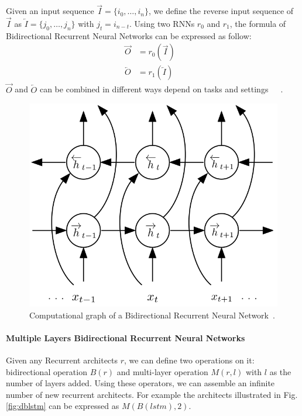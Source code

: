 Given an input sequence \(\overrightarrow{I} = \{i_0,\ldots,i_n\}\), we define the reverse input sequence of \(\overrightarrow{I}\) as \(\overleftarrow{I} = \{j_0,\ldots,j_n\}\) with \(j_t = i_{n-t}\). 
Using two RNNs \(r_0\) and \(r_1\), the formula of Bidirectional Recurrent Neural Networks can be expressed as follow:
\begin{align}
    \overrightarrow{O} &= r_0(\overrightarrow{I}) &\\
    \overleftarrow{O} &= r_1(\overleftarrow{I}) &
\end{align}
\(\overrightarrow{O}\) and \(\overleftarrow{O}\) can be combined in different ways depend on tasks and settings~\cite{GravesLSTM}~\cite{Graves-thesis}~\cite{treeLSTM}.

\begin{figure}[H]
    \centering
    \includegraphics[scale=0.4]{figure/blstm}
    \caption[Bidirectional Recurrent Neural Network]{Computational graph of a Bidirectional Recurrent Neural Network~\cite{GravesLSTM}.}
    \label{fig:blstm}
\end{figure}

\paragraph{Multiple Layers Bidirectional Recurrent Neural Networks}
Given any Recurrent architects \(r\), we can define two operations on it: bidirectional operation \(B(r)\) and multi-layer operation \(M(r, l)\) with \(l\) as the number of layers added.
Using these operators, we can assemble an infinite number of new recurrent architects. 
For example the architects illustrated in Fig.\ref{fig:dblstm} can be expressed as \(M(B(lstm), 2)\).

